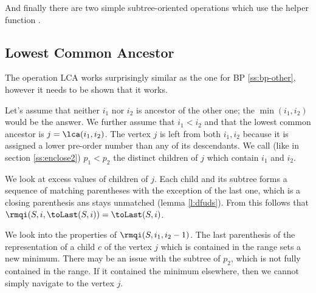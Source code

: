 And finally there are two simple subtree-oriented operations which use the helper function \toLast{}.

\begin{algorithm}
\begin{algorithmic}
		\State {}
	\Else
		\State {}
	\EndIf
\EndFunction
\end{algorithmic}
\end{algorithm}

\begin{algorithm}
\begin{algorithmic}
		\State {}
	\Else
		\State {}
	\EndIf
\EndFunction
\end{algorithmic}
\end{algorithm}

\subsection{Lowest Common Ancestor}

The operation LCA works surprisingly similar as the one for BP \ref{ss:bp-other}, however it needs to be shown that it works.

Let's assume that neither $i_1$ nor $i_2$ is ancestor of the other one; the $\min(i_1, i_2)$ would be the answer.
We further assume that $i_1 < i_2$ and that the lowest common ancestor is $j = \lca(i_1, i_2)$.
The vertex $j$ is left from both $i_1, i_2$ because it is assigned a lower pre-order number than any of its descendants.
We call (like in section \ref{ss:enclose2}) $p_1 < p_2$ the distinct children of $j$ which contain $i_1$ and $i_2$.

We look at excess values of children of $j$.
Each child and its subtree forms a sequence of matching parentheses with the exception of the last one, which is a closing parenthesis ans stays unmatched (lemma \ref{l:dfuds}).
From this follows that $\rmqi(S, i, \toLast(S, i)) = \toLast(S, i)$.

We look into the properties of $\rmqi(S, i_1, i_2 - 1)$.
The last parenthesis of the representation of a child $c$ of the vertex $j$ which is contained in the range sets a new minimum.
There may be an issue with the subtree of $p_2$, which is not fully contained in the range.
If it contained the minimum elsewhere, then we cannot simply navigate to the vertex $j$.

